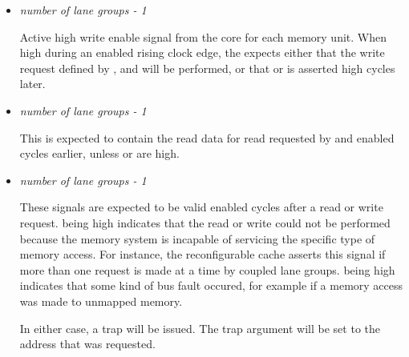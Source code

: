 \begin{itemize}
\vspace{1em}
\item {}\textit{number of lane groups - 1}

Active high write enable signal from the core for each memory unit. When high 
during an enabled rising clock edge, the \rvex{} expects either that the write 
request defined by ,  and 
 will be performed, or that  or 
 is asserted high  cycles later.

\vspace{1em}
\item {}\textit{number of lane groups - 1}

This is expected to contain the read data for read requested by 
 and   enabled cycles 
earlier, unless  or  are high.

\vspace{1em}
\item {}\textit{number of lane groups - 1}

These signals are expected to be valid  enabled cycles after a read 
or write request.  being high indicates that the read 
or write could not be performed because the memory system is incapable of 
servicing the specific type of memory access. For instance, the reconfigurable 
cache asserts this signal if more than one request is made at a time by coupled 
lane groups.  being high indicates that some kind of bus 
fault occured, for example if a memory access was made to unmapped memory.

In either case, a  trap will be issued. The trap argument will 
be set to the address that was requested.


\end{itemize}

